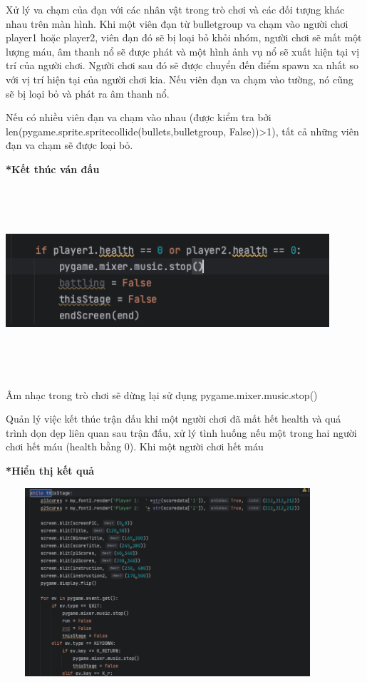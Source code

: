 \documentclass[a4paper]{article}
\begin{document}
        Xử lý va chạm của đạn với các nhân vật trong trò chơi và các đối tượng khác nhau trên màn hình. Khi một viên đạn từ bulletgroup va chạm vào người chơi player1 hoặc player2, viên đạn đó sẽ bị loại bỏ khỏi nhóm, người chơi sẽ mất một lượng máu, âm thanh nổ sẽ được phát và một hình ảnh vụ nổ sẽ xuất hiện tại vị trí của người chơi. Người chơi sau đó sẽ được chuyển đến điểm spawn xa nhất so với vị trí hiện tại của người chơi kia. Nếu viên đạn va chạm vào tường, nó cũng sẽ bị loại bỏ và phát ra âm thanh nổ.

        Nếu có nhiều viên đạn va chạm vào nhau (được kiểm tra bởi len(pygame.sprite.spritecollide(bullets,bulletgroup, False))>1), tất cả những viên đạn va chạm sẽ được loại bỏ.

        \textbf{*Kết thúc ván đấu }

        \includegraphics[width=12cm,height=7cm]{endWar.png}

        Âm nhạc trong trò chơi sẽ dừng lại sử dụng pygame.mixer.music.stop()
        
         Quản lý việc kết thúc trận đấu khi một người chơi đã mất hết health và quá trình dọn dẹp liên quan sau trận đấu, xử lý tình huống nếu một trong hai người chơi hết máu (health bằng 0). Khi một người chơi hết máu

         \textbf{*Hiển thị kết quả }

         \includegraphics[width=12cm,height=7cm]{kq1.png}
         
\end{document}
